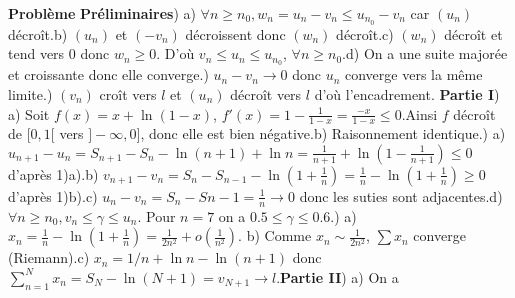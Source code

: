 \textbf{Probl\`eme}\newline\newline
\textbf{Pr\'eliminaires}\newline{}) a) $\forall n\geq n_0,
w_n=u_n-v_n\leq u_{n_0}-v_n$ car $(u_n)$ d\'ecro\^it.\newline b)
$(u_n)$ et $(-v_n)$ d\'ecroissent donc $(w_n)$
d\'ecro\^it.\newline c) $(w_n)$ d\'ecro\^it et tend vers 0 donc
$w_n\geq 0$. D'o\`u $v_n\leq u_n\leq u_{n_0}$, $\forall n\geq
n_0$.\newline d) On a une suite major\'ee et croissante donc elle
converge.) $u_n-v_n\rightarrow 0$ donc $u_n$ converge
vers la m\^eme limite.) $(v_n)$ cro\^it vers $l$ et
$(u_n)$ d\'ecro\^it vers $l$ d'o\`u l'encadrement.\newline\newline
\textbf{Partie I}\newline{}) a) Soit $f(x)=x+\ln(1-x)$,
$\displaystyle{f'(x)=1-\frac{1}{1-x}=\frac{-x}{1-x}\leq
0}$.\newline Ainsi $f$ d\'ecro\^it de $[0,1[$ vers $]-\infty,0]$,
donc elle est bien n\'egative.\newline b) Raisonnement
identique.) a)
$\displaystyle{u_{n+1}-u_n=S_{n+1}-S_n-\ln(n+1)+\ln
n=\frac{1}{n+1}+\ln(1-\frac{1}{n+1})\leq 0}$ d'apr\`es
1)a).\newline b)
$\displaystyle{v_{n+1}-v_n=S_n-S_{n-1}-\ln(1+\frac{1}{n})=\frac{1}{n}-\ln(1+\frac{1}{n})\geq
0}$ d'apr\`es 1)b).\newline c)
$\displaystyle{u_n-v_n=S_n-S{n-1}=\frac{1}{n}\rightarrow 0}$ donc
les suties sont adjacentes.\newline d) $\forall n\geq n_0, v_n\leq
\gamma\leq u_n$. Pour $n=7$ on a $0.5\leq \gamma\leq 0.6$.) a)
$\displaystyle{x_n=\frac{1}{n}-\ln(1+\frac{1}{n})=\frac{1}{2n^2}+o(\frac{1}{n^2})}$.\newline
b) Comme $\displaystyle{x_n\sim\frac{1}{2n^2}}$, $\sum x_n$
converge (Riemann).\newline c) $x_n=1/n+\ln n-\ln(n+1)$ donc
$\displaystyle{\sum_{n=1}^N x_n=S_N-\ln(N+1)=v_{N+1}\rightarrow
l}$.\newline\newline \textbf{Partie II}\newline{}) a) On a
